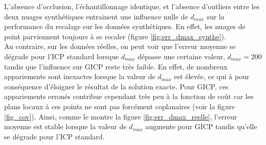 L'absence d'occlusion, l'échantillonnage identique, et l'absence d'outliers entre les deux nuages synthétiques entrainent une influence nulle de $d_{max}$ sur la performance du recalage sur les données synthétiques. En effet, les nuages de point parviennent toujours à se recaler (figure \ref{fig:err_dmax_synthe}).\\

Au contraire, sur les données réelles, on peut voir que l'erreur moyenne se dégrade pour l'ICP standard lorsque $d_{max}$ dépasse une certaine valeur, $d_{max}=200$ tandis que l'influence sur GICP reste très faible. En effet, de nombreux appariements sont inexactes lorsque la valeur de $d_{max}$ est élevée, ce qui à pour conséquence d'éloigner le résultat de la solution exacte. Pour GICP, ces appariements erronés contribue cependant très peu à la fonction de coût car les plans locaux à ces points ne sont pas forcément coplanaires (voir la figure \ref{fig_cov}). Ainsi, comme le montre la figure \ref{fig:err_dmax_reelle}, l'erreur moyenne est stable lorsque la valeur de $d_{max}$ augmente pour GICP tandis qu'elle se dégrade pour l'ICP standard.\\

